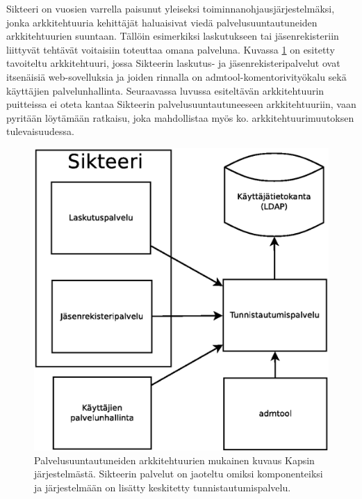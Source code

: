 Sikteeri on vuosien varrella paisunut yleiseksi toiminnanohjausjärjestelmäksi, jonka arkkitehtuuria kehittäjät haluaisivat viedä palvelusuuntautuneiden arkkitehtuurien suuntaan. Tällöin esimerkiksi laskutukseen tai jäsenrekisteriin liittyvät tehtävät voitaisiin toteuttaa omana palveluna. Kuvassa \ref{kapsi_uusi} on esitetty tavoiteltu arkkitehtuuri, jossa Sikteerin laskutus- ja jäsenrekisteripalvelut ovat itsenäisiä web-sovelluksia ja joiden rinnalla on admtool-komentorivityökalu sekä käyttäjien palvelunhallinta. Seuraavassa luvussa esiteltävän arkkitehtuurin puitteissa ei oteta kantaa Sikteerin palvelusuuntautuneeseen arkkitehtuuriin, vaan pyritään löytämään ratkaisu, joka mahdollistaa myös ko. arkkitehtuurimuutoksen tulevaisuudessa.

\begin{figure}[ht]
\centering
\includegraphics[width=.6\textwidth]{toteutus/muutostarve/kapsi_uusi_soa.eps}
\caption{Palvelusuuntautuneiden arkkitehtuurien mukainen kuvaus Kapsin järjestelmästä. Sikteerin palvelut on jaoteltu omiksi komponenteiksi ja järjestelmään on lisätty keskitetty tunnistautumispalvelu.}%
\label{kapsi_uusi}
\end{figure}